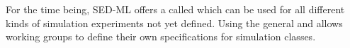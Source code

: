 \label{class:anySimulation}
For the time being, SED-ML offers a  called  which can be used for all different kinds of simulation experiments not yet defined. Using the general  and  allows working groups to define their own specifications for simulation classes.


